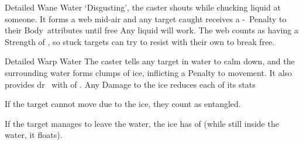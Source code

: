 \ifodd\value{diceNo}

  {Detailed}%
  {Wane}%
  {Water}%
  {}%
  {`Disgusting', the caster shouts while chucking liquid at someone.
  It forms a web mid-air and any target caught receives a -~Penalty to their Body~\glspl{attribute} until free}%
  {
    Any liquid will work.
    The web counts as having a Strength of , so stuck targets can try to resist with their own  to break free.
  }

\else

  {Detailed}%
  {Warp}%
  {Water}%
  {}%
  {The caster tells any target in water to calm down, and the surrounding water forms clumps of ice, inflicting a  Penalty to movement.
  It also provides \gls{dr}~ with  of .
  Any Damage to the ice reduces each of its stats}%
  {
  If the target cannot move due to the ice, they count as entangled.

  If the target manages to leave the water, the ice has  of  (while still inside the water, it floats).}

\fi
{}
